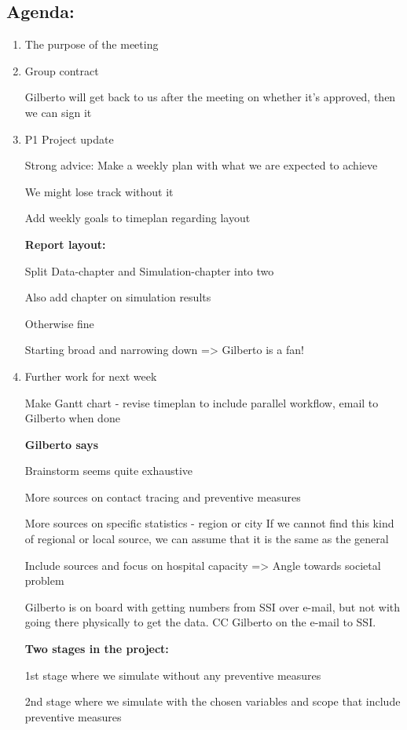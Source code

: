 \subsection{Agenda: }
\begin{enumerate}
\item The purpose of the meeting
\item Group contract 

Gilberto will get back to us after the meeting on whether it's approved,
then we can sign it

\item P1 Project update

Strong advice: Make a weekly plan with what we are expected to achieve

We might lose track without it

Add weekly goals to timeplan regarding layout

\textbf{Report layout:}

Split Data-chapter and Simulation-chapter into two


Also add chapter on simulation results


Otherwise fine


Starting broad and narrowing down => Gilberto is a fan!

\item Further work for next week

Make Gantt chart - revise timeplan to include parallel workflow, email to Gilberto when done

\textbf{Gilberto says}

Brainstorm seems quite exhaustive

More sources on contact tracing and preventive measures

More sources on specific statistics - region or city
If we cannot find this kind of regional or local source, we can assume that it is the same as the general

Include sources and focus on hospital capacity => Angle towards societal problem

Gilberto is on board with getting numbers from SSI over e-mail, but not with going there physically to get the data. CC Gilberto on the e-mail to SSI.

\textbf{Two stages in the project:}

1st stage where we simulate without any preventive measures

2nd stage where we simulate with the chosen variables and scope that include preventive measures


\end{enumerate}
